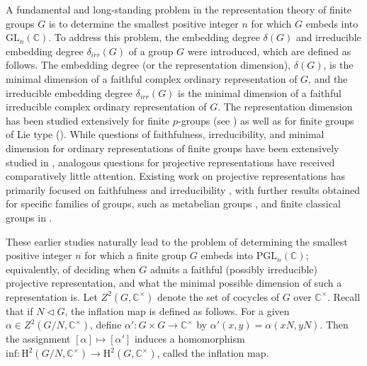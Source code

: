 \documentclass[a4paper,11pt]{amsart}
\numberwithin{equation}{section}
\numberwithin{equation}{subsection}
\newcommand{\Nayak}[1]{{\color{red} #1}}
\newcommand{\poonam}[1]{{\color{blue} #1}}
\begin{document}
	A fundamental and long-standing problem in the representation theory of finite groups $G$ is to determine the smallest positive integer $n$ for which $G$ embeds into $\mathrm{GL}_n(\mathbb{C})$.
	To address this problem, the embedding degree $\delta(G)$ and irreducible embedding degree $\delta_{irr}(G)$ of a group $G$ were introduced, which are defined as follows. The embedding degree (or the representation dimension), $\delta(G)$, is the minimal dimension of a faithful complex ordinary representation of $G$, and the irreducible embedding degree $\delta_{irr}(G)$ is the minimal dimension of a faithful irreducible complex ordinary representation of $G$. 
	The representation dimension has been studied extensively for finite $p$-groups (see \cite{bardestani, cernele, kaur}) as well as for finite groups of Lie type (\cite{Lusztig, Lübeck}).
	While questions of faithfulness, irreducibility, and minimal dimension for ordinary representations of finite groups have been extensively studied in \cite{ Martino, moreto, Prajapati, SZECHTMAN}, analogous questions for projective representations have received comparatively little attention.
	Existing work on projective representations has
	primarily focused on faithfulness and irreducibility \cite{Bekka, frucht, HIGGS, Morris}, with further results obtained for specific families of groups, such as metabelian groups \cite{NG}, and finite classical groups in \cite{LANDAZURI, Zalesskii}. %
	
	These earlier studies naturally lead to the problem of determining the smallest positive integer $n$ for which a finite group $G$ embeds into $\mathrm{PGL}_n(\mathbb{C})$; equivalently, of deciding when $G$ admits a faithful (possibly irreducible) projective representation, and what the minimal possible dimension of such a representation is. 
	Let $Z^2(G,\mathbb C^\times)$ denote the set of cocycles of $G$ over $\mathbb C^\times$.
	Recall that if $N \lhd G$, the inflation map is defined as follows. For a given $\alpha \in Z^2(G/N, \mathbb{C}^{\times})$, define $\alpha' : G \times G \to \mathbb{C}^{\times}$ by $\alpha'(x, y) = \alpha(xN, yN)$. Then the assignment $[\alpha] \mapsto [\alpha']$ induces a homomorphism $\text{inf} : \text{H}^2(G/N, \mathbb{C}^{\times}) \to \text{H}^2(G, \mathbb{C}^{\times})$, called the inflation map. 
	
\end{document}
